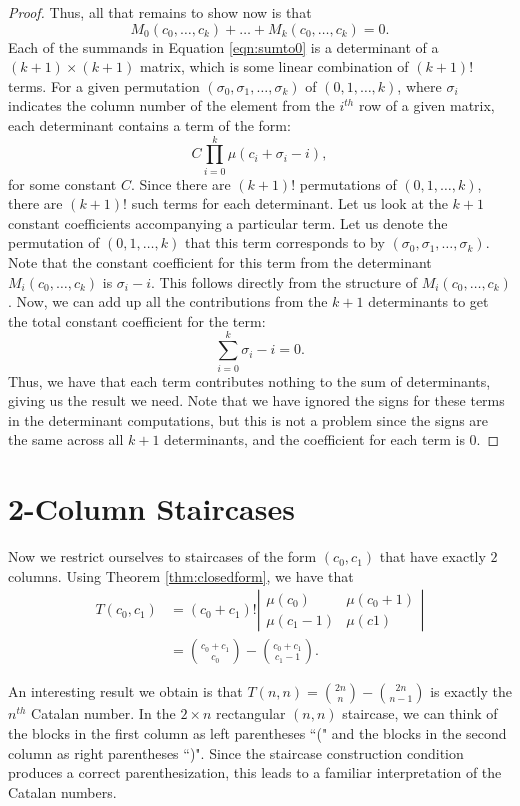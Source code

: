 \documentclass[12pt]{amsart}
\newcommand{\M}{M}
\newcommand{\newsection}[2]{
\section{#1 \label{#2}}
}
\begin{document}
\begin{proof}
Thus, all that remains to show now is that
\begin{equation}
\M_0(c_0,\dots,c_k) + \dots + \M_k(c_0,\dots,c_k) = 0.
\label{eqn:sumto0}
\end{equation}
Each of the summands in Equation \ref{eqn:sumto0} is a determinant of a $(k+1)\times(k+1)$ matrix, which is some linear combination of $(k+1)!$ terms. For a given permutation $(\sigma_0, \sigma_1, \dots, \sigma_k)$ of $(0,1,\dots,k)$, where $\sigma_i$ indicates the column number of the element from the $i^{th}$ row of a given matrix, each determinant contains a term of the form:
$$
C \prod_{i=0}^{k}{\mu(c_i+\sigma_i-i)},
$$
for some constant $C$. Since there are $(k+1)!$ permutations of $(0,1,\dots,k)$, there are $(k+1)!$ such terms for each determinant. Let us look at the $k+1$ constant coefficients accompanying a particular term. Let us denote the permutation of $(0,1,\dots,k)$ that this term corresponds to by $(\sigma_0, \sigma_1, \dots, \sigma_k)$. Note that the constant coefficient for this term from the determinant $\M_i(c_0,\dots,c_k)$ is $\sigma_i - i$. This follows directly from the structure of $\M_i(c_0,\dots,c_k)$. Now, we can add up all the contributions from the $k+1$ determinants to get the total constant coefficient for the term:
$$
\sum_{i=0}^{k}{\sigma_i-i} = 0.
$$
Thus, we have that each term contributes nothing to the sum of determinants, giving us the result we need. Note that we have ignored the signs for these terms in the determinant computations, but this is not a problem since the signs are the same across all $k+1$ determinants, and the coefficient for each term is $0$.
\end{proof}

\newsection{2-Column Staircases}{sec:twocolumn}
Now we restrict ourselves to staircases of the form $(c_0,c_1)$ that have exactly $2$ columns. Using Theorem \ref{thm:closedform}, we have that
\begin{align*}
T(c_0,c_1) & = (c_0 + c_1)! \left|
\begin{matrix}
\mu(c_0) & \mu(c_0 + 1) \\
\mu(c_1 - 1) & \mu(c1)
\end{matrix}\right| \\
& =\binom{c_0 + c_1}{c_0} - \binom{c_0 + c_1}{c_1 - 1}.
\end{align*}

An interesting result we obtain is that $T(n,n) = \binom{2n}{n} - \binom{2n}{n-1}$ is exactly the $n^{th}$ Catalan number. In the $2 \times n$ rectangular $(n,n)$ staircase, we can think of the blocks in the first column as left parentheses ``(" and the blocks in the second column as right parentheses ``)". Since the staircase construction condition produces a correct parenthesization, this leads to a familiar interpretation of the Catalan numbers. 
\end{document}
